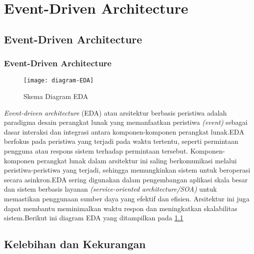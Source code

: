 \chapter{Event-Driven Architecture}


\section{Event-Driven Architecture}
\subsection{Event-Driven Architecture}
\begin{figure}[h]
	\centering
	\texttt{[image: diagram-EDA]}
	\caption{Skema Diagram EDA}
	\label{fig:diagram-EDA}
\end{figure}
\textit{Event-driven architecture} (EDA) atau arsitektur berbasis peristiwa adalah paradigma desain perangkat lunak yang memanfaatkan peristiwa \textit{(event)} sebagai dasar interaksi dan integrasi antara komponen-komponen perangkat lunak.EDA berfokus pada peristiwa yang terjadi pada waktu tertentu, seperti permintaan pengguna atau respons sistem terhadap permintaan tersebut. Komponen-komponen perangkat lunak dalam arsitektur ini saling berkomunikasi melalui peristiwa-peristiwa yang terjadi, sehingga memungkinkan sistem untuk beroperasi secara asinkron.EDA sering digunakan dalam pengembangan aplikasi skala besar dan sistem berbasis layanan \textit{ (service-oriented architecture/SOA)} untuk memastikan penggunaan sumber daya yang efektif dan efisien. Arsitektur ini juga dapat membantu meminimalkan waktu respon dan meningkatkan skalabilitas sistem.Berikut ini diagram EDA yang ditampilkan pada \ref{fig:diagram-EDA}


\section{Kelebihan dan Kekurangan}
